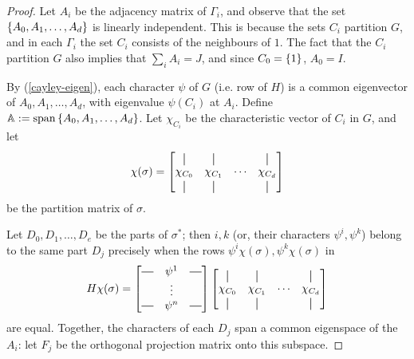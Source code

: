 \documentclass{report}
\newcommand*{\vertbar}{\rule[-1ex]{0.5pt}{2.5ex}}
\newcommand*{\horzbar}{\rule[.5ex]{2.5ex}{0.5pt}}
\newcommand{\BMA}{\mathbb{A}}
\begin{document}
    \begin{proof}
      Let $A_i$ be the adjacency matrix of $\Gamma_i$,
      and observe that the set $\left\lbrace A_0, A_1, \ldots, A_d \right\rbrace$ is linearly
      independent.  This is because the sets $C_i$ partition $G$, and in each
      $\Gamma_i$ the set $C_i$ consists of the neighbours of $1$.
      The fact that the $C_i$ partition $G$ also implies that $\sum_i A_i = J$,
      and since $C_0 = \left\lbrace 1 \right\rbrace$, $A_0 = I$.

      By (\ref{cayley-eigen}), each character $\psi$ of $G$ (i.e. row of $H$)
      is a common eigenvector of $A_0, A_1, \ldots, A_d$,
      with eigenvalue $\psi(C_i)$ at $A_i$.
      Define $\BMA := \Span\set{A_0, A_1, \ldots, A_d}$.
      Let $\chi_{C_i}$ be the characteristic vector of $C_i$ in $G$,
      and let
      \begin{equation}\label{part-mat-sigma}
        \chi(\sigma) =
        \begin{bmatrix}
          \vertbar   & \vertbar   &        & \vertbar   \\
          \chi_{C_0} & \chi_{C_1} & \cdots & \chi_{C_d} \\
          \vertbar   & \vertbar   &        & \vertbar   \\
        \end{bmatrix}
      \end{equation}
      be the partition matrix of $\sigma$.

      Let $D_0, D_1, \ldots, D_e$ be the parts of $\sigma^*$;
      then $i, k$ (or, their characters $\psi^i, \psi^k$)
      belong to the same part $D_j$ precisely when the rows
      $\psi^i \chi(\sigma), \psi^k \chi(\sigma)$ in
      \begin{equation}
        H \chi(\sigma) =
        \begin{bmatrix}
          \horzbar & \psi^1 & \horzbar \\
                   & \vdots &          \\
          \horzbar & \psi^n & \horzbar \\
        \end{bmatrix}
        \begin{bmatrix}
          \vertbar   & \vertbar   &        & \vertbar   \\
          \chi_{C_0} & \chi_{C_1} & \cdots & \chi_{C_d} \\
          \vertbar   & \vertbar   &        & \vertbar   \\
        \end{bmatrix}
      \end{equation}
      are equal.
      Together, the characters of each $D_j$ span a common eigenspace of the
      $A_i$: let $F_j$ be the orthogonal projection matrix onto this subspace.


\end{proof}
\end{document}
